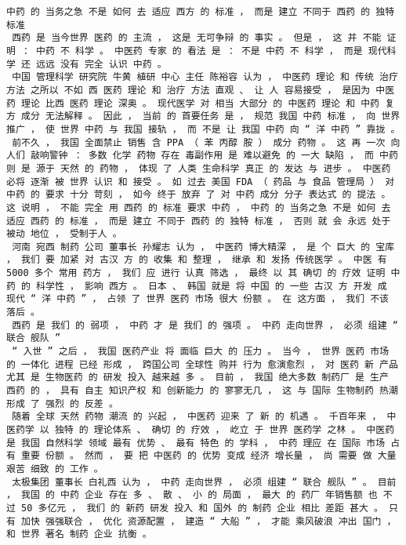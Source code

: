 \documentclass{article}
\begin{document}
\begin{Verbatim}[commandchars=\\\{\}]
 中药 的 当务之急 不是 如何 去 适应 西方 的 标准 ， 而是 建立 不同于 西药 的 独特 标准 
 西药 是 当今世界 医药 的 主流 ， 这是 无可争辩 的 事实 。 但是 ， 这 并 不能 证明 ： 中药 不 科学 。 中医药 专家 的 看法 是 ： 不是 中药 不 科学 ， 而是 现代科学 还 远远 没有 完全 认识 中药 。 
 中国 管理科学 研究院 牛黄 植研 中心 主任 陈裕容 认为 ， 中医药 理论 和 传统 治疗 方法 之所以 不如 西 医药 理论 和 治疗 方法 直观 、 让 人 容易接受 ， 是因为 中医药 理论 比西 医药 理论 深奥 。 现代医学 对 相当 大部分 的 中医药 理论 和 中药 复方 成分 无法解释 。 因此 ， 当前 的 首要任务 是 ， 规范 我国 中药 标准 ， 向 世界 推广 ， 使 世界 中药 与 我国 接轨 ， 而 不是 让 我国 中药 向 “ 洋 中药 ” 靠拢 。 
 前不久 ， 我国 全面禁止 销售 含 PPA （ 苯 丙醇 胺 ） 成分 药物 。 这 再 一次 向 人们 敲响警钟 ： 多数 化学 药物 存在 毒副作用 是 难以避免 的 一大 缺陷 ， 而 中药 则 是 源于 天然 的 药物 ， 体现 了 人类 生命科学 真正 的 发达 与 进步 。 中医药 必将 逐渐 被 世界 认识 和 接受 。 如 过去 美国 FDA （ 药品 与 食品 管理局 ） 对 中药 的 要求 十分 苛刻 ， 如今 终于 放弃 了 对 中药 成分 分子 表达式 的 提法 。 这 说明 ， 不能 完全 用 西药 的 标准 要求 中药 ， 中药 的 当务之急 不是 如何 去 适应 西药 的 标准 ， 而是 建立 不同于 西药 的 独特 标准 ， 否则 就 会 永远 处于 被动 地位 ， 受制于人 。 
 河南 宛西 制药 公司 董事长 孙耀志 认为 ， 中医药 博大精深 ， 是 个 巨大 的 宝库 ， 我们 要 加紧 对 古汉 方 的 收集 和 整理 ， 继承 和 发扬 传统医学 。 中医 有 5000 多个 常用 药方 ， 我们 应 进行 认真 筛选 ， 最终 以 其 确切 的 疗效 证明 中药 的 科学性 ， 影响 西方 。 日本 、 韩国 就是 将 中国 的 一些 古汉 方 开发 成 现代 “ 洋 中药 ” ， 占领 了 世界 医药 市场 很大 份额 。 在 这方面 ， 我们 不该 落后 。 
 西药 是 我们 的 弱项 ， 中药 才 是 我们 的 强项 。 中药 走向世界 ， 必须 组建 “ 联合 舰队 ” 
 “ 入世 ” 之后 ， 我国 医药产业 将 面临 巨大 的 压力 。 当今 ， 世界 医药 市场 的 一体化 进程 已经 形成 ， 跨国公司 全球性 购并 行为 愈演愈烈 ， 对 医药 新 产品 尤其 是 生物医药 的 研发 投入 越来越 多 。 目前 ， 我国 绝大多数 制药厂 是 生产 西药 的 ， 具有 自主 知识产权 和 创新能力 的 寥寥无几 ， 这 与 国际 生物制药 热潮 形成 了 强烈 的 反差 。 
 随着 全球 天然 药物 潮流 的 兴起 ， 中医药 迎来 了 新 的 机遇 。 千百年来 ， 中 医药学 以 独特 的 理论体系 、 确切 的 疗效 ， 屹立 于 世界 医药学 之林 。 中医药 是 我国 自然科学 领域 最有 优势 、 最有 特色 的 学科 ， 中药 理应 在 国际 市场 占有 重要 份额 。 然而 ， 要 把 中医药 的 优势 变成 经济 增长量 ， 尚 需要 做 大量 艰苦 细致 的 工作 。 
 太极集团 董事长 白礼西 认为 ， 中药 走向世界 ， 必须 组建 “ 联合 舰队 ” 。 目前 ， 我国 的 中药 企业 存在 多 、 散 、 小 的 局面 ， 最大 的 药厂 年销售额 也 不过 50 多亿元 ， 我们 的 新药 研发 投入 和 国外 的 制药 企业 相比 差距 甚大 。 只有 加快 强强联合 ， 优化 资源配置 ， 建造 “ 大船 ” ， 才能 乘风破浪 冲出 国门 ， 和 世界 著名 制药 企业 抗衡 。 

\end{Verbatim}
\end{document}
